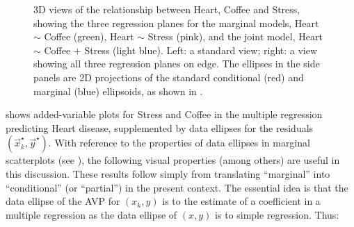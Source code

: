 \begin{figure}[htb]
\begin{minipage}[b]{.49\linewidth}
 \end{minipage}
  \caption{3D views of the relationship between Heart, Coffee and Stress, showing the three regression planes
  for the marginal models, Heart $\sim$ Coffee (green), Heart $\sim$ Stress (pink), and the joint model, Heart $\sim$ Coffee $+$ Stress (light blue).
  Left: a standard view; right: a view showing all three regression planes on edge.
  The ellipses in the side panels are 2D projections of the standard conditional (red) and marginal (blue) ellipsoids, as shown in .
  }
  \label{fig:coffee-av3D}
\end{figure}


 shows added-variable plots for Stress and Coffee in the multiple regression predicting Heart disease,
supplemented by data ellipses for the residuals $(\vec{x}_k^\star, \vec{y}^\star)$.  With reference to the properties
of data ellipses in marginal scatterplots (see ), the following visual properties (among others)
are useful in this discussion.  These results follow simply from translating ``marginal'' into ``conditional'' (or ``partial'')
in the present context. 
The essential idea is that the data ellipse of the AVP for $(x_k, y)$ is to the estimate of a coefficient in a multiple regression as
 the data ellipse of $(x, y)$ is to simple regression. Thus:


